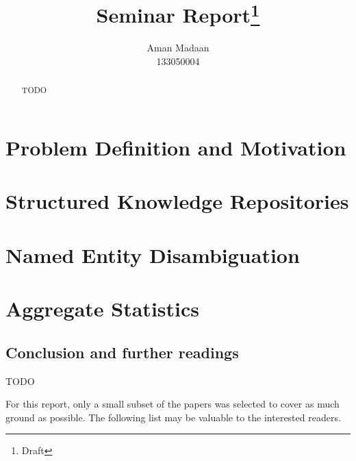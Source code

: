 \documentclass[a4paper,10pt]{report}
\title{Seminar Report\footnote{Draft}}
\author{Aman Madaan \\ 133050004}
\begin{document}
\maketitle
\tableofcontents

\begin{abstract}
TODO
\end{abstract}

\part{Problem Definition and Motivation}


\part{Structured Knowledge Repositories}


\part{Named Entity Disambiguation}



\part{Aggregate Statistics}


\chapter{Conclusion and further readings}
TODO

For this report, only a small subset of the papers was selected to cover as much ground as possible.
The following list may be valuable to the interested readers.
\end{document}
